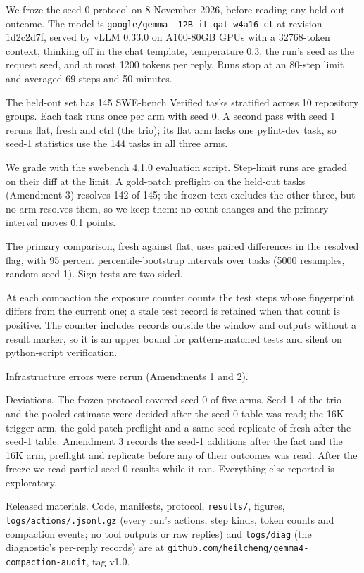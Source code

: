 \documentclass[11pt,a4paper]{article}
\begin{document}
We froze the seed-0 protocol on 8 November 2026, before reading any held-out outcome. The model is \texttt{google/\allowbreak gemma--\allowbreak 12B-\allowbreak it-\allowbreak qat-\allowbreak w4a16-\allowbreak ct} at revision 1d2c2d7f, served by vLLM 0.33.0 \citep{kwon2023} on A100-80GB GPUs with a 32768-token context, thinking off in the chat template, temperature 0.3, the run's seed as the request seed, and at most 1200 tokens per reply. Runs stop at an 80-step limit and averaged 69 steps and 50 minutes.

The held-out set has 145 SWE-bench Verified tasks \citep{jimenez2024,chowdhury2024} stratified across 10 repository groups. Each task runs once per arm with seed 0. A second pass with seed 1 reruns flat, fresh and ctrl (the trio); its flat arm lacks one pylint-dev task, so seed-1 statistics use the 144 tasks in all three arms.

We grade with the swebench 4.1.0 evaluation script. Step-limit runs are graded on their diff at the limit. A gold-patch preflight on the held-out tasks (Amendment 3) resolves 142 of 145; the frozen text excludes the other three, but no arm resolves them, so we keep them: no count changes and the primary interval moves 0.1 points.

The primary comparison, fresh against flat, uses paired differences in the resolved flag, with 95 percent percentile-bootstrap intervals over tasks (5000 resamples, random seed 1). Sign tests are two-sided.

At each compaction the exposure counter counts the test steps whose fingerprint differs from the current one; a stale test record is retained when that count is positive. The counter includes records outside the window and outputs without a result marker, so it is an upper bound for pattern-matched tests and silent on python-script verification.

Infrastructure errors were rerun (Amendments 1 and 2).

Deviations. The frozen protocol covered seed 0 of five arms. Seed 1 of the trio and the pooled estimate were decided after the seed-0 table was read; the 16K-trigger arm, the gold-patch preflight and a same-seed replicate of fresh after the seed-1 table. Amendment 3 records the seed-1 additions after the fact and the 16K arm, preflight and replicate before any of their outcomes was read. After the freeze we read partial seed-0 results while it ran. Everything else reported is exploratory.

Released materials. Code, manifests, protocol, \texttt{results/}, figures, \texttt{logs/\allowbreak actions/\allowbreak *.jsonl.gz} (every run's actions, step kinds, token counts and compaction events; no tool outputs or raw replies) and \texttt{logs/\allowbreak diag} (the diagnostic's per-reply records) are at \texttt{github.com/\allowbreak heilcheng/\allowbreak gemma4-\allowbreak compaction-\allowbreak audit}, tag v1.0.
\end{document}
